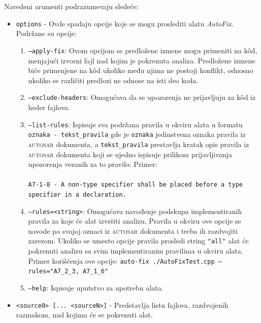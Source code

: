 \documentclass[12pt,oneside]{memoir}
\begin{document}
Navedeni arumenti podrazumevaju sledeće:
\begin{itemize}
  \item \texttt{options} - Ovde spadaju opcije koje se mogu proslediti alatu \textit{AutoFix}. Podr\v{z}ane su opcije:
  \begin{enumerate}
    \item \texttt{--apply-fix}: Ovom opcijom se predlo\v{z}ene izmene mogu primeniti na k\^{o}d, menjaju\'{c}i izvorni fajl nad kojim je pokrenuta analiza.
    Predlo\v{z}ene izmene bi\'{c}e primenjene na k\^{o}d ukoliko među njima ne postoji konflikt, odnosno ukoliko se razli\v{c}iti predlozi ne odnose na isti deo koda.
    \item \texttt{--exclude-headers}: Omogu\'{c}ava da se upozorenja ne prijavljuju za k\^{o}d iz heder fajlova.
    \item \texttt{--list-rules}: Ispisuje sva podr\v{z}ana pravila u okviru alata u formatu \texttt{oznaka - tekst\_pravila} gde je \texttt{oznaka} jedinstvena oznaka pravila iz \textsc{autosar} dokumenta, a \texttt{tekst\_pravila} prestavlja kratak opis pravila iz \textsc{autosar} dokumenta koji se ujedno ispisuje prilikom prijavljivanja upozorenja vezanih za to pravilo. Primer: \\ \\
  \texttt{A7-1-8 - A non-type specifier shall be placed before a type \\ specifier in a declaration.} \\
    \item \texttt{--rules=<string>}: Omogu\'{c}ava navođenje podskupa implementiranih pravila za koje \'{c}e alat izvr\v{s}iti analizu. Pravila u okviru ove opcije
    se navode po svojoj oznaci iz \textsc{autosar} dokumenta i treba ih razdvojiti zarezom. Ukoliko se umesto opcije pravila prosledi string \texttt{"all"} alat \'{c}e pokrenuti
    analizu sa svim implementiranim pravilima u okviru alata. Primer kori\v{s}\'{c}enja ove opcije: \newline\newline
    \texttt{auto-fix ./AutoFixTest.cpp --rules="A7\_2\_3, A7\_1\_6"} \\
    \item \texttt{--help}: Ispisuje uputstvo za upotrebu alata.
  \end{enumerate}

\item \texttt{<source0> [... <sourceN>]} - Predstavlja listu fajlova, razdvojenih razmakom, nad kojima \'{c}e se pokrenuti alat.

\end{itemize}
\end{document}
